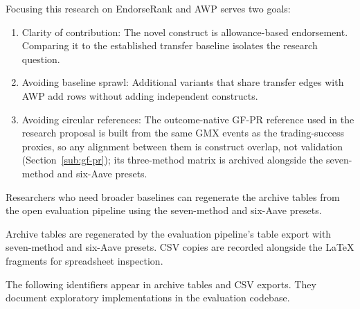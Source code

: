 Focusing this research on EndorseRank and AWP serves two goals:

\begin{enumerate}
\item Clarity of contribution: The novel construct is allowance-based endorsement. Comparing it to the established transfer baseline isolates the research question.
\item Avoiding baseline sprawl: Additional variants that share transfer edges with AWP add rows without adding independent constructs.
\item Avoiding circular references: The outcome-native GF-PR reference used in the research proposal is built from the same GMX events as the trading-success proxies, so any alignment between them is construct overlap, not validation (Section~\ref{sub:gf-pr}); its three-method matrix is archived alongside the seven-method and six-Aave presets.
\end{enumerate}

Researchers who need broader baselines can regenerate the archive tables from the open evaluation pipeline using the seven-method and six-Aave presets.


Archive tables are regenerated by the evaluation pipeline's table export with seven-method and six-Aave presets. CSV copies are recorded alongside the LaTeX fragments for spreadsheet inspection.


The following identifiers appear in archive tables and CSV exports. They document exploratory implementations in the evaluation codebase.

